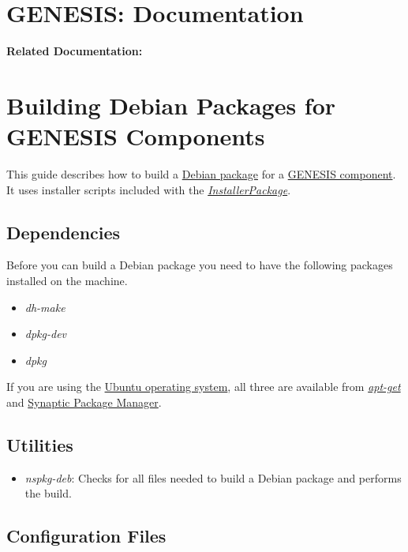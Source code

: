 \documentclass[12pt]{article}
\begin{document}
\section*{GENESIS: Documentation}

{\bf Related Documentation:}

\section*{Building Debian Packages for GENESIS Components}

This guide describes how to build a \href{http://www.debian.org/doc/manuals/apt-howto/index.en.html#contents}{Debian package} for a \href{../reserved-words/reserved-words.tex}{GENESIS component}. It uses installer scripts included with the \href{../installer-package/installer-package.tex}{\it InstallerPackage}.

\subsection*{Dependencies}

Before you can build a Debian package you need to have the following packages installed on the machine.
\begin{itemize}
   \item{\it dh-make}
   \item{\it dpkg-dev}
   \item{\it dpkg}
\end{itemize}

If you are using the \href{http://www.ubuntu.com/}{Ubuntu operating system}, all three are available from \href{http://www.debian.org/doc/manuals/apt-howto/}{\it apt-get} and \href{http://www.nongnu.org/synaptic/}{Synaptic Package Manager}.


\subsection*{Utilities}
\begin{itemize}
\item {\it nspkg-deb}: Checks for all files needed to build a Debian package and performs the build.
\end{itemize}
\subsection*{Configuration Files}
\end{document}

